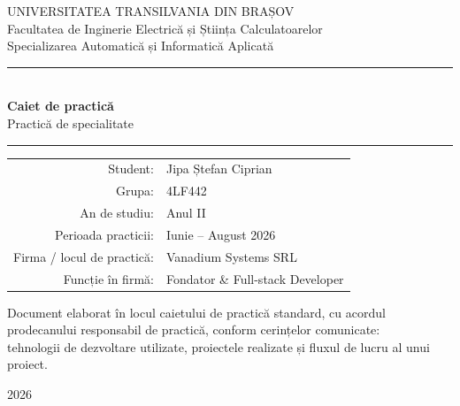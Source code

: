 \documentclass[11pt, a4paper]{article}
\begin{document}
\begin{titlepage}
\begin{center}

\vspace*{1.5cm}
{\large UNIVERSITATEA TRANSILVANIA DIN BRAȘOV}\\[0.2em]
{\large Facultatea de Inginerie Electrică și Știința Calculatoarelor}\\[0.2em]
{\normalsize Specializarea Automatică și Informatică Aplicată}

\vspace{2.5cm}
\rule{0.5\linewidth}{0.4pt}\\[0.6em]
{\Huge\bfseries\color{vsnavy} Caiet de practică}\\[0.6em]
{\Large Practică de specialitate}\\[0.6em]
\rule{0.5\linewidth}{0.4pt}

\vspace{2.5cm}
{\large
\begin{tabular}{rl}
Student: & Jipa Ștefan Ciprian \\[0.3em]
Grupa: & 4LF442 \\[0.3em]
An de studiu: & Anul II \\[0.3em]
Perioada practicii: & Iunie -- August 2026 \\[0.3em]
Firma / locul de practică: & Vanadium Systems SRL \\[0.3em]
Funcție în firmă: & Fondator \& Full-stack Developer \\
\end{tabular}
}

\vfill
{\small\color{vsgray}
Document elaborat în locul caietului de practică standard, cu acordul\\
prodecanului responsabil de practică, conform cerințelor comunicate:\\
tehnologii de dezvoltare utilizate, proiectele realizate și fluxul de lucru al unui proiect.}

\vspace{1cm}
{\small 2026}

\end{center}
\end{titlepage}

\setcounter{tocdepth}{2}
\tableofcontents
\newpage

\end{document}

